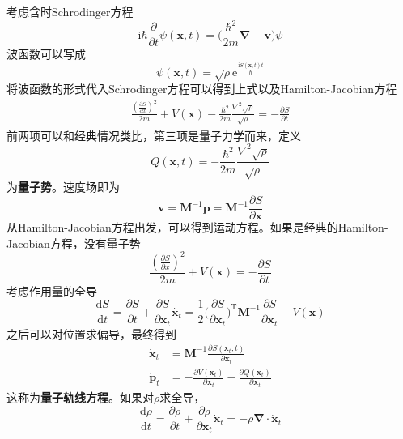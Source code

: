 \documentclass[12pt]{article}
\begin{document}
考虑含时Schrodinger方程
\begin{equation*}
    \mathrm{i}\hbar \frac {\partial}{\partial t} \psi(\bm{x},t) = \bigg(\frac {\hbar^2}{2m}\bm{\nabla + \bm{v}}\bigg)\psi
\end{equation*}
波函数可以写成
\begin{equation*}
    \psi(\bm{x},t) = \sqrt{\rho} \mathrm{e}^{\frac {\mathrm{i}S(\bm{x},t)t}{\hbar}}
\end{equation*}
将波函数的形式代入Schrodinger方程可以得到上式以及Hamilton-Jacobian方程
\begin{align*}
    \frac {(\frac {\partial S}{\partial x})^2}{2m} + V(\bm{x}) - \frac {\hbar^2}{2m} \frac {\nabla^2 \sqrt{\rho}}{\sqrt{\rho}} = -\frac {\partial S}{\partial t}
\end{align*}
前两项可以和经典情况类比，第三项是量子力学而来，定义
\begin{equation*}
    Q(\bm{x},t) = - \frac {\hbar^2}{2m} \frac {\nabla^2 \sqrt{\rho}}{\sqrt{\rho}}
\end{equation*}
为\textbf{量子势}。速度场即为
\begin{equation*}
    \bm{v} = \bm{M}^{-1}\bm{p} = \bm{M}^{-1}\frac {\partial S}{\partial \bm{x}}
\end{equation*}
从Hamilton-Jacobian方程出发，可以得到运动方程。如果是经典的Hamilton-Jacobian方程，没有量子势
\begin{equation*}
    \frac {(\frac {\partial S}{\partial x})^2}{2m} + V(\bm{x}) = -\frac {\partial S}{\partial t}
\end{equation*}
考虑作用量的全导
\begin{equation*}
    \frac {\mathrm{d}S}{\mathrm{d}t} = \frac {\partial S}{\partial t} + \frac {\partial S}{\partial \bm{x}_t} \dot{\bm{x}_t} = \frac 12 \bigg(\frac {\partial S}{\partial \bm{x}_t}\bigg)^{\mathrm{T}} \bm{M}^{-1} \frac {\partial S}{\partial \bm{x}_t} - V(\bm{x})
\end{equation*}
之后可以对位置求偏导，最终得到
\begin{align*}
    \dot{\bm{x}}_t &= \bm{M}^{-1} \frac {\partial S(\bm{x}_t,t)}{\partial \bm{x}_t}\\
    \dot{\bm{p}}_t &= -\frac {\partial V(\bm{x}_t)}{\partial \bm{x}_t} - \frac {\partial Q(\bm{x}_t)}{\partial \bm{x}_t}
\end{align*}
这称为\textbf{量子轨线方程}。如果对$\rho$求全导，
\begin{equation*}
    \frac {\mathrm{d}\rho}{\mathrm{d}t} = \frac {\partial \rho}{\partial t} + \frac {\partial \rho}{\partial \bm{x}_t} \dot{\bm{x}}_t = -\rho \bm{\nabla} \cdot \dot{\bm{x}}_t
\end{equation*}
\end{document}
